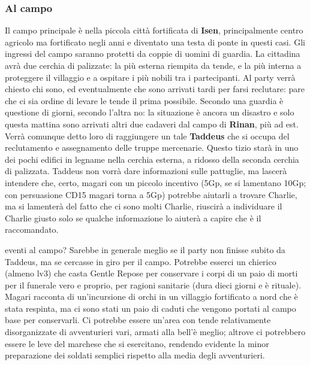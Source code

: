\documentclass[10pt,twoside, twocolumn, openany]{dndbook}
\begin{document}
\subsubsection{Al campo}
Il campo principale è nella piccola città fortificata di \textbf{Isen}, principalmente centro agricolo ma fortificato negli anni e diventato una testa di ponte in questi casi.
Gli ingressi del campo saranno protetti da coppie di uomini di guardia. La cittadina avrà due cerchia di palizzate: la più esterna riempita da tende, e la più interna a proteggere il villaggio e a ospitare i più nobili tra i partecipanti.
Al party verrà chiesto chi sono, ed eventualmente che sono arrivati tardi per farsi reclutare: pare che ci sia ordine di levare le tende il prima possibile. Secondo una guardia è questione di giorni, secondo l'altra no: la situazione è ancora un disastro e solo questa mattina sono arrivati altri due cadaveri dal campo di \textbf{Rinan}, più ad est.
Verrà comunque detto loro di raggiungere un tale \textbf{Taddeus} che si occupa del reclutamento e assegnamento delle truppe mercenarie.  
Questo tizio starà in uno dei pochi edifici in legname nella cerchia esterna, a ridosso della seconda cerchia di palizzata.
Taddeus non vorrà dare informazioni sulle pattuglie, ma lascerà intendere che, certo, magari con un piccolo incentivo (5Gp, se si lamentano 10Gp; con persuasione CD15 magari torna a 5Gp) potrebbe aiutarli a trovare Charlie, ma si lamenterà del fatto che ci sono molti Charlie, riuscirà a individuare il Charlie giusto solo se qualche informazione lo aiuterà a capire che è il raccomandato. 

\begin{DndComment}{eventi al campo?}
  Sarebbe in generale meglio se il party non finisse subito da Taddeus, ma se cercasse in giro per il campo. Potrebbe esserci un chierico (almeno lv3) che casta Gentle Repose per conservare i corpi di un paio di morti per il funerale vero e proprio, per ragioni sanitarie (dura dieci giorni e è rituale).
  Magari racconta di un'incursione di orchi in un villaggio fortificato a nord che è stata respinta, ma ci sono stati un paio di caduti che vengono portati al campo base per conservarli.
  Ci potrebbe essere un'area con tende relativamente disorganizzate di avventurieri vari, armati alla bell'è meglio; altrove ci potrebbero essere le leve del marchese che si esercitano, rendendo evidente la minor preparazione dei soldati semplici rispetto alla media degli avventurieri.
  
\end{DndComment}
\end{document}
